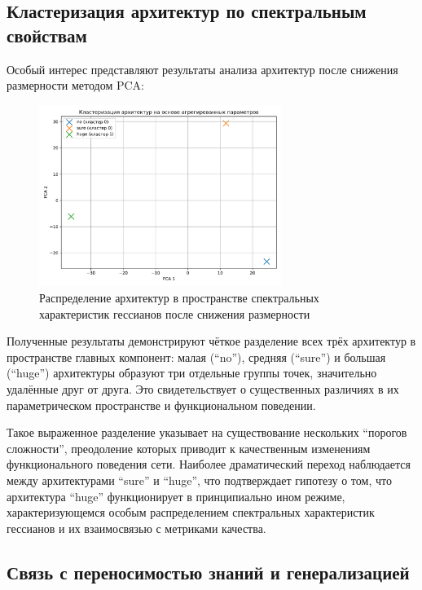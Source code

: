 \documentclass[a4paper,12pt]{article}
\begin{document}
\newpage

\subsection{Кластеризация архитектур по спектральным свойствам}

Особый интерес представляют результаты анализа архитектур после снижения размерности методом PCA:

\begin{figure}[ht]
  \centering
  \includegraphics[width=0.7\textwidth]{resources/architecture_clustering.pdf}
  \caption{Распределение архитектур в пространстве спектральных характеристик гессианов после снижения размерности}
  \label{fig:architecture_clustering}
\end{figure}

Полученные результаты демонстрируют чёткое разделение всех трёх архитектур в пространстве главных компонент:
малая (``no''), средняя (``sure'') и большая (``huge'') архитектуры образуют три отдельные группы точек,
значительно удалённые друг от друга. Это свидетельствует о существенных различиях в их параметрическом
пространстве и функциональном поведении.

Такое выраженное разделение указывает на существование нескольких ``порогов сложности'', преодоление которых
приводит к качественным изменениям функционального поведения сети. Наиболее драматический переход наблюдается
между архитектурами ``sure'' и ``huge'', что подтверждает гипотезу о том, что архитектура ``huge''
функционирует в принципиально ином режиме, характеризующемся особым распределением спектральных характеристик
гессианов и их взаимосвязью с метриками качества.

\subsection{Связь с переносимостью знаний и генерализацией}
\end{document}
